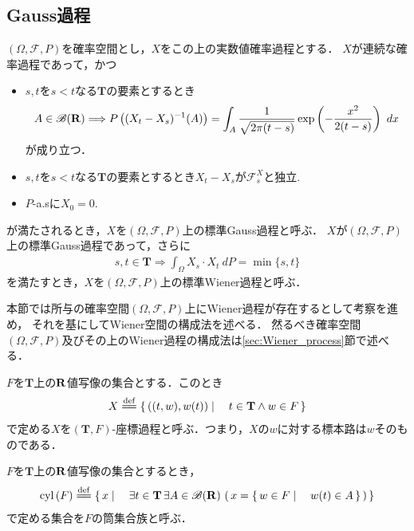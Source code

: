\subsection{Gauss過程}
	$(\Omega,\mathscr{F},P)$を確率空間とし，$X$をこの上の実数値確率過程とする．
	$X$が連続な確率過程であって，かつ
	\begin{itemize}
		\item $s,t$を$s < t$なる$\mathbf{T}$の要素とするとき
			\begin{align}
				A \in \mathscr{B}(\mathbf{R}) \Longrightarrow
				P\left((X_t-X_s)^{-1}(A)\right)
				= \int_A \frac{1}{\sqrt{2\pi(t-s)}} \exp\left(-\frac{x^2}{2(t-s)}\right)\ dx
			\end{align}
			が成り立つ．
		
		\item $s,t$を$s < t$なる$\mathbf{T}$の要素とするとき$X_t - X_s$が$\mathscr{F}^X_s$と独立.
			
		\item $P$-a.sに$X_0 = 0$.
	\end{itemize}
	が満たされるとき，$X$を$(\Omega,\mathscr{F},P)$上の標準Gauss過程と呼ぶ．
	$X$が$(\Omega,\mathscr{F},P)$上の標準Gauss過程であって，さらに
	\begin{align}
		s,t \in \mathbf{T} \Longrightarrow \int_\Omega X_s \cdot X_t\ dP = \min{\{s,t\}}
	\end{align}
	を満たすとき，$X$を$(\Omega,\mathscr{F},P)$上の標準Wiener過程と呼ぶ．
	
	本節では所与の確率空間$(\Omega,\mathscr{F},P)$上にWiener過程が存在するとして考察を進め，
	それを基にしてWiener空間の構成法を述べる．
	然るべき確率空間$(\Omega,\mathscr{F},P)$及びその上のWiener過程の構成法は\ref{sec:Wiener_process}節で述べる．
	
	\begin{screen}
		\begin{dfn}[座標過程]
			$F$を$\mathbf{T}$上の$\mathbf{R}$値写像の集合とする．このとき
			\begin{align}
				X \defeq \Set{((t,w),w(t))}{t \in \mathbf{T} \wedge w \in F}
			\end{align}
			で定める$X$を$(\mathbf{T},F)$-座標過程と呼ぶ．つまり，$X$の$w$に対する標本路は$w$そのものである．
		\end{dfn}
	\end{screen}
	
	\begin{screen}
		\begin{dfn}[筒集合]
			$F$を$\mathbf{T}$上の$\mathbf{R}$値写像の集合とするとき，
			\begin{align}
				\cyl{F} \defeq 
				\Set{x}{\exists t \in \mathbf{T}\, \exists A \in \borel{\R}\, 
				\left(\, x = \Set{w \in F}{w(t) \in A}\, \right)}
			\end{align}
			で定める集合を$F$の筒集合族と呼ぶ．
		\end{dfn}
	\end{screen}
	
